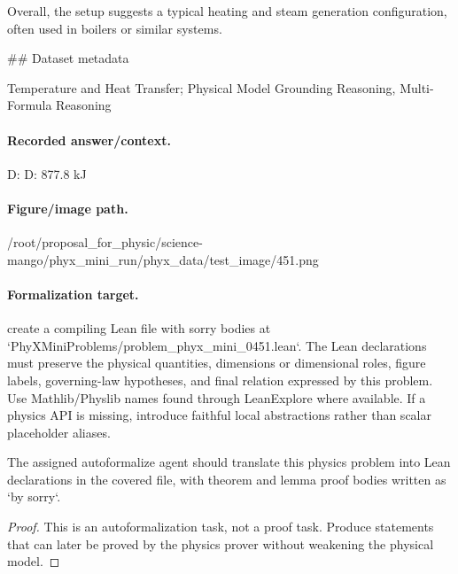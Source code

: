 Overall, the setup suggests a typical heating and steam generation configuration, often used in boilers or similar systems.

\#\# Dataset metadata

Temperature and Heat Transfer; Physical Model Grounding Reasoning, Multi-Formula Reasoning

\paragraph{Recorded answer/context.}
D: D: 877.8 kJ

\paragraph{Figure/image path.}
/root/proposal\_for\_physic/science-mango/phyx\_mini\_run/phyx\_data/test\_image/451.png

\paragraph{Formalization target.}
create a compiling Lean file with sorry bodies at `PhyXMiniProblems/problem\_phyx\_mini\_0451.lean`. The Lean declarations must preserve the physical quantities, dimensions or dimensional roles, figure labels, governing-law hypotheses, and final relation expressed by this problem.
Use Mathlib/Physlib names found through LeanExplore where available. If a physics API is missing, introduce faithful local abstractions rather than scalar placeholder aliases.

\begin{theorem}
\label{thm:physics:phyx_mini_0451:target}
The assigned autoformalize agent should translate this physics problem into Lean declarations in the covered file, with theorem and lemma proof bodies written as `by sorry`.
\end{theorem}
\begin{proof}
This is an autoformalization task, not a proof task. Produce statements that can later be proved by the physics prover without weakening the physical model.
\end{proof}

